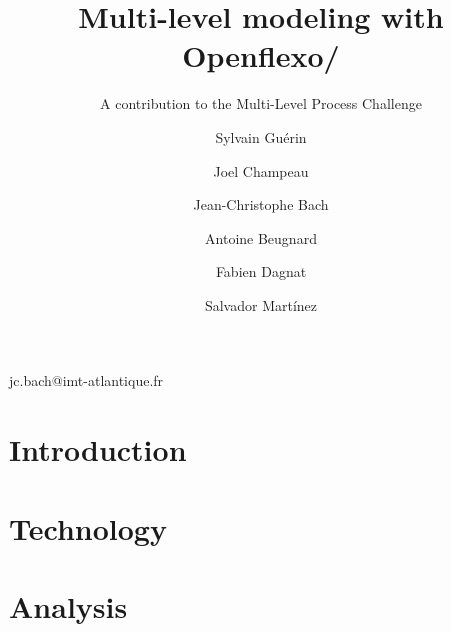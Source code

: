 \documentclass[american]{emisa}
\newcommand{\mpc}{MULTI process challenge\xspace}%
\newcommand{\mlpc}{Multi-Level Process Challenge\xspace}
\begin{document}
\begin{article}{
    \title{Multi-level modeling with Openflexo/\FML}
    \subtitle{A contribution to the \mlpc} %

    \author{Sylvain Guérin}%
    \address{ENSTA Bretagne, Lab-STICC, UMR 6285, Brest, France}

    \author{Joel Champeau}
    \address[a]{}

    \author*{Jean-Christophe Bach}{jc.bach@imt-atlantique.fr}
    \address{IMT Atlantique, Lab-STICC, UMR 6285, Brest, France}

    \author{Antoine Beugnard}
    \address[b]{}

    \author{Fabien Dagnat}
    \address[b]{}

    \author{Salvador Mart\'inez}
    \address[b]{}

    \abstract{}
    
}

\section{Introduction}
\label{sec:introduction}



\section{Technology}
\label{sec:technology}


\section{Analysis}
\label{sec:analysis}



\end{article}
\end{document}
